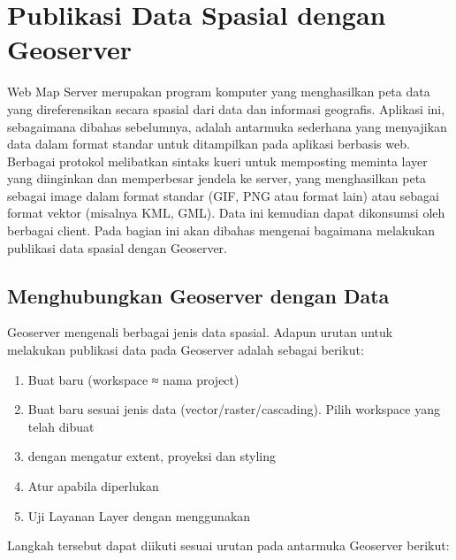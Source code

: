 \documentclass[letterpaper,10pt,english]{sphinxmanual}
\begin{document}
\section{Publikasi Data Spasial dengan Geoserver}
\label{\detokenize{sesi3/publikasi:publikasi-data-spasial-dengan-geoserver}}\label{\detokenize{sesi3/publikasi::doc}}
Web Map Server merupakan program komputer yang menghasilkan peta data yang direferensikan secara spasial dari
data dan informasi geografis. Aplikasi ini, sebagaimana dibahas sebelumnya, adalah antarmuka sederhana yang menyajikan data dalam format standar untuk ditampilkan pada aplikasi berbasis web. Berbagai protokol melibatkan sintaks kueri untuk memposting meminta layer yang diinginkan dan memperbesar jendela ke server, yang menghasilkan peta sebagai image dalam format standar (GIF, PNG atau format lain) atau sebagai format vektor (misalnya KML, GML). Data ini kemudian dapat dikonsumsi oleh berbagai client. Pada bagian ini akan dibahas mengenai bagaimana melakukan publikasi data spasial dengan Geoserver.


\subsection{Menghubungkan Geoserver dengan Data}
\label{\detokenize{sesi3/publikasi:menghubungkan-geoserver-dengan-data}}
Geoserver mengenali berbagai jenis data spasial. Adapun urutan untuk melakukan publikasi data pada Geoserver adalah sebagai berikut:
\begin{enumerate}
%
\item {} 
Buat  baru (workspace ≈ nama project)

\item {} 
Buat  baru sesuai jenis data (vector/raster/cascading). Pilih workspace yang telah dibuat

\item {} 
 dengan mengatur extent, proyeksi dan styling

\item {} 
Atur  apabila diperlukan

\item {} 
Uji Layanan Layer dengan menggunakan 

\end{enumerate}

Langkah tersebut dapat diikuti sesuai urutan pada antarmuka Geoserver berikut:
\end{document}
